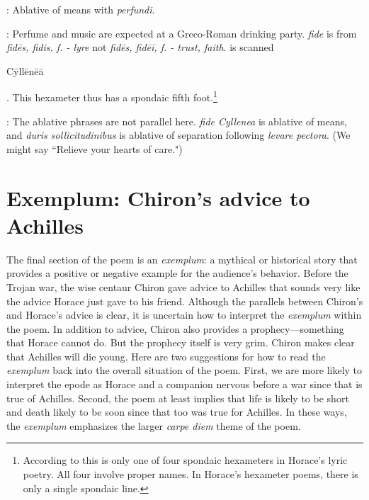 
: Ablative of means with \textit{perfundi}.


: Perfume and music are expected at a Greco-Roman drinking party.  \textit{fide} is from \textit{fidēs, fidis, f. - lyre} not  \textit{fidēs, fidēī, f. - trust, faith}.\indent{} is scanned \begin{metrica}C\=yll\=en\=e\=a\end{metrica}.  This hexameter thus has a spondaic fifth foot.\footnote{According to \citet[220]{mankin1995} this is only one of four spondaic hexameters in Horace's lyric poetry.  All four involve proper names.  In Horace's hexameter poems, there is only a single spondaic line.}


: The ablative phrases are not parallel here.  \textit{fide Cyllenea} is ablative of means, and \textit{duris sollicitudinibus} is ablative of separation following \textit{levare pectora}.  (We might say ``Relieve your hearts of care.") 


\section*{Exemplum: Chiron's advice to Achilles}

The final section of the poem is an \textit{exemplum}: a mythical or historical story that provides a positive or negative example for the audience's behavior.  Before the Trojan war, the wise centaur Chiron gave advice to Achilles that sounds very like the advice Horace just gave to his friend.  Although the parallels between Chiron's and Horace's advice is clear, it is uncertain how to interpret the \textit{exemplum} within the poem.  In addition to advice, Chiron also provides a prophecy---something that Horace cannot do.  But the prophecy itself is very grim.  Chiron makes clear that Achilles will die young.  Here are two suggestions for how to read the \textit{exemplum} back into the overall situation of the poem.  First, we are more likely to interpret the epode as Horace and a companion nervous before a war since that is true of Achilles.  Second, the poem at least implies that life is likely to be short and death likely to be soon since that too was true for Achilles.  In these ways, the \textit{exemplum} emphasizes the larger \textit{carpe diem} theme of the poem.

